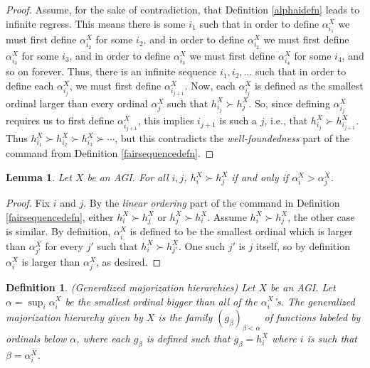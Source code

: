 \documentclass{article}
\newtheorem{definition}[theorem]{Definition}
\newtheorem{lemma}[theorem]{Lemma}
\begin{document}
\begin{proof}
    Assume, for the sake of contradiction, that Definition \ref{alphaidefn}
    leads to infinite regress. This means there is some $i_1$ such that
    in order to define $\alpha^X_{i_1}$ we must first define $\alpha^X_{i_2}$
    for some $i_2$, and in order to define $\alpha^X_{i_2}$ we must first
    define $\alpha^X_{i_3}$ for some $i_3$, and in order to define
    $\alpha^X_{i_3}$ we must first define $\alpha^X_{i_4}$ for some $i_4$,
    and so on forever. Thus, there is an infinite sequence $i_1,i_2,\ldots$
    such that in order to define each $\alpha^X_{i_j}$, we must first
    define $\alpha^X_{i_{j+1}}$. Now, each $\alpha^X_{i_j}$ is defined as
    the smallest ordinal larger than every ordinal $\alpha^X_j$ such that
    $h^X_{i_j}\succ h^X_j$. So, since defining $\alpha^X_{i_j}$ requires
    us to first define $\alpha^X_{i_{j+1}}$, this implies $i_{j+1}$ is
    such a $j$, i.e., that $h^X_{i_j}\succ h^X_{i_{j+1}}$.
    Thus $h^X_{i_1}\succ h^X_{i_2}\succ h^X_{i_3}\succ\cdots$,
    but this contradicts the \emph{well-foundedness} part of the command
    from Definition \ref{fairsequencedefn}.
\end{proof}

\begin{lemma}
\label{technicallemmaaboutalphaXi}
    Let $X$ be an AGI. For all $i,j$,
    $h^X_i\succ h^X_j$ if and only if $\alpha^X_i>\alpha^X_j$.
\end{lemma}

\begin{proof}
    Fix $i$ and $j$.
    By the \emph{linear ordering} part of the command in Definition
    \ref{fairsequencedefn}, either $h^X_i\succ h^X_j$ or $h^X_j\succ h^X_i$.
    Assume $h^X_i\succ h^X_j$, the other case is similar.
    By definition, $\alpha^X_i$ is defined to be the smallest ordinal
    which is larger than $\alpha^X_{j'}$ for every $j'$ such that
    $h^X_i\succ h^X_{j'}$. One such $j'$ is $j$ itself,
    so by definition $\alpha^X_i$ is larger than $\alpha^X_j$, as desired.
\end{proof}

\begin{definition}
\label{generalizedmajorizationhierarchydefn}
(Generalized majorization hierarchies)
    Let $X$ be an AGI. Let $\alpha=\sup_i \alpha^X_i$ be the smallest ordinal
    bigger than all of the $\alpha^X_i$'s. The \emph{generalized majorization
    hierarchy given by $X$} is the family $(g_\beta)_{\beta<\alpha}$ of functions
    labeled by ordinals below $\alpha$, where each $g_{\beta}$ is defined
    such that $g_{\beta}=h^X_i$ where $i$ is such that $\beta=\alpha^X_i$.
\end{definition}
\end{document}
